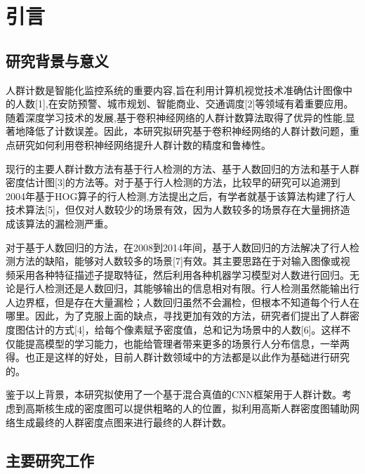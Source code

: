 \section{引言}
\subsection{研究背景与意义}
人群计数是智能化监控系统的重要内容,旨在利用计算机视觉技术准确估计图像中的人数[1],在安防预警、城市规划、智能商业、交通调度[2]等领域有着重要应用。随着深度学习技术的发展,基于卷积神经网络的人群计数算法取得了优异的性能,显著地降低了计数误差。因此，本研究拟研究基于卷积神经网络的人群计数问题，重点研究如何利用卷积神经网络提升人群计数的精度和鲁棒性。
\par
现行的主要人群计数方法有基于行人检测的方法、基于人数回归的方法和基于人群密度估计图[3]的方法等。对于基于行人检测的方法，比较早的研究可以追溯到2004年基于HOG算子的行人检测,方法提出之后，有学者就基于该算法构建了行人技术算法[5]，但仅对人数较少的场景有效，因为人数较多的场景存在大量拥挤造成该算法的漏检测严重。\par
对于基于人数回归的方法，在2008到2014年间，基于人数回归的方法解决了行人检测方法的缺陷，能够对人数较多的场景[7]有效。其主要思路在于对输入图像或视频采用各种特征描述子提取特征，然后利用各种机器学习模型对人数进行回归。无论是行人检测还是人数回归，其能够输出的信息相对有限。行人检测虽然能输出行人边界框，但是存在大量漏检；人数回归虽然不会漏检，但根本不知道每个行人在哪里。因此，为了克服上面的缺点，寻找更加有效的方法，研究者们提出了人群密度图估计的方式[4]，给每个像素赋予密度值，总和记为场景中的人数[6]。这样不仅能提高模型的学习能力，也能给管理者带来更多的场景行人分布信息，一举两得。也正是这样的好处，目前人群计数领域中的方法都是以此作为基础进行研究的。\par
鉴于以上背景，本研究拟使用了一个基于混合真值的CNN框架用于人群计数。考虑到高斯核生成的密度图可以提供粗略的人的位置，拟利用高斯人群密度图辅助网络生成最终的人群密度点图来进行最终的人群计数。







\subsection{主要研究工作}

